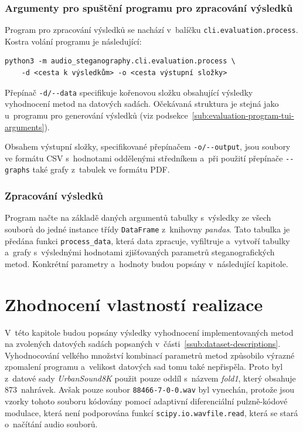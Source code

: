 \subsection*{Argumenty pro spuštění programu pro zpracování výsledků}
\label{sub:evaluation-processing-program-tui-arguments}

Program pro zpracování výsledků se nachází v~balíčku
\texttt{cli.evaluation.process}. Kostra volání programu je následující:

\begin{verbatim}
python3 -m audio_steganography.cli.evaluation.process \
    -d <cesta k výsledkům> -o <cesta výstupní složky>
\end{verbatim}

\noindent Přepínač \verb|-d/--data| specifikuje kořenovou složku obsahující
výsledky vyhodnocení metod na datových sadách. Očekávaná struktura je stejná
jako u~programu pro generování výsledků
(viz podsekce~\ref{sub:evaluation-program-tui-arguments}).

Obsahem výstupní složky, specifikované přepínačem \verb|-o/--output|, jsou
soubory ve formátu CSV s~hodnotami oddělenými středníkem a~při použití
přepínače \verb|--graphs| také grafy z~tabulek ve formátu PDF.

\subsection*{Zpracování výsledků}
\label{sub:evaluation-processing-program}

Program načte na základě daných argumentů tabulky s~výsledky ze všech souborů
do jedné instance třídy \texttt{DataFrame} z~knihovny \textit{pandas}. Tato
tabulka je předána funkci \texttt{process\_data}, která data zpracuje,
vyfiltruje a~vytvoří tabulky a~grafy s~výslednými hodnotami zjišťovaných
parametrů steganografických metod. Konkrétní parametry a~hodnoty budou popsány
v~následující kapitole.


\chapter{Zhodnocení vlastností realizace}
\label{cha:method-evaluation}

V~této kapitole budou popsány výsledky vyhodnocení implementovaných metod na
zvolených datových sadách popsaných v~části~\ref{ssub:dataset-descriptions}.
Vyhodnocování velkého množství kombinací parametrů metod způsobilo výrazné
zpomalení programu a~velikost datových sad tomu také nepřispěla. Proto byl
z~datové sady \textit{UrbanSound8K} použit pouze oddíl s~názvem \textit{fold1},
který obsahuje 873~nahrávek. Avšak pouze soubor \texttt{88466-7-0-0.wav} byl
vynechán, protože jsou vzorky tohoto souboru kódovány pomocí adaptivní
diferenciální pulzně-kódové modulace, která není podporována funkcí
\texttt{scipy.io.wavfile.read}, která se stará o~načítání audio souborů.

